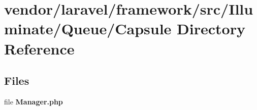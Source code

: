 \section{vendor/laravel/framework/src/\+Illuminate/\+Queue/\+Capsule Directory Reference}
\label{dir_768639ae0e1cb34cb628d7e06a584a17}
\subsection*{Files}
\begin{DoxyCompactItemize}
\item 
file {\bf Manager.\+php}
\end{DoxyCompactItemize}

